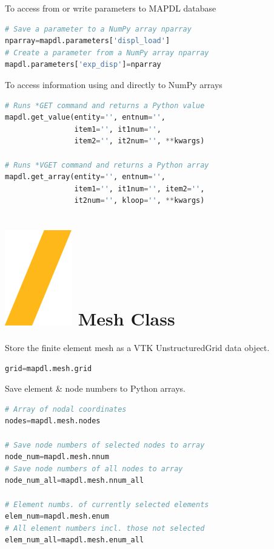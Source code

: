 \documentclass[9pt,landscape]{article}
\begin{document}
\begin{multicols}{3}
To access from or write parameters to MAPDL database
\begin{lstlisting}[language=Python]
# Save a parameter to a NumPy array nparray
nparray=mapdl.parameters['displ_load']
# Create a parameter from a NumPy array nparray
mapdl.parameters['exp_disp']=nparray
\end{lstlisting} 

To access information using  and  directly to NumPy arrays
\begin{lstlisting}[language=Python]
# Runs *GET command and returns a Python value
mapdl.get_value(entity='', entnum='',
                item1='', it1num='',
                item2='', it2num='', **kwargs)

# Runs *VGET command and returns a Python array
mapdl.get_array(entity='', entnum='',
                item1='', it1num='', item2='',
                it2num='', kloop='', **kwargs)
\end{lstlisting} 

\section{\includegraphics[height=\fontcharht\font`\S]{slash.png} Mesh Class}
Store the finite element mesh as a VTK UnstructuredGrid data object.
\begin{lstlisting}[language=Python]
grid=mapdl.mesh.grid
\end{lstlisting} 

Save element \& node numbers to Python arrays.
\begin{lstlisting}[language=Python]
# Array of nodal coordinates
nodes=mapdl.mesh.nodes

# Save node numbers of selected nodes to array
node_num=mapdl.mesh.nnum
# Save node numbers of all nodes to array
node_num_all=mapdl.mesh.nnum_all

# Element numbs. of currently selected elements
elem_num=mapdl.mesh.enum
# All element numbers incl. those not selected
elem_num_all=mapdl.mesh.enum_all
\end{lstlisting} 
\vfill


\end{multicols}
\end{document}
